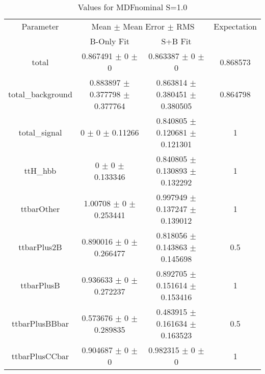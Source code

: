 \begin{table}
\centering
\caption{Values for MDFnominal S=1.0}
\begin{tabular}{cccc}
\toprule
Parameter & \multicolumn{2}{c}{Mean $\pm$ Mean Error $\pm$ RMS} & Expectation\\
 & B-Only Fit & S+B Fit & \\
\midrule
total & \num{0.867491} $\pm$ \num{0} $\pm$ \num{0} & \num{0.863387} $\pm$ \num{0} $\pm$ \num{0} & \num{0.868573}\\
total\_background & \num{0.883897} $\pm$ \num{0.377798} $\pm$ \num{0.377764} & \num{0.863814} $\pm$ \num{0.380451} $\pm$ \num{0.380505} & \num{0.864798}\\
total\_signal & \num{0} $\pm$ \num{0} $\pm$ \num{0.11266} & \num{0.840805} $\pm$ \num{0.120681} $\pm$ \num{0.121301} & \num{1}\\
ttH\_hbb & \num{0} $\pm$ \num{0} $\pm$ \num{0.133346} & \num{0.840805} $\pm$ \num{0.130893} $\pm$ \num{0.132292} & \num{1}\\
ttbarOther & \num{1.00708} $\pm$ \num{0} $\pm$ \num{0.253441} & \num{0.997949} $\pm$ \num{0.137247} $\pm$ \num{0.139012} & \num{1}\\
ttbarPlus2B & \num{0.890016} $\pm$ \num{0} $\pm$ \num{0.266477} & \num{0.818056} $\pm$ \num{0.143863} $\pm$ \num{0.145698} & \num{0.5}\\
ttbarPlusB & \num{0.936633} $\pm$ \num{0} $\pm$ \num{0.272237} & \num{0.892705} $\pm$ \num{0.151614} $\pm$ \num{0.153416} & \num{1}\\
ttbarPlusBBbar & \num{0.573676} $\pm$ \num{0} $\pm$ \num{0.289835} & \num{0.483915} $\pm$ \num{0.161634} $\pm$ \num{0.163523} & \num{0.5}\\
ttbarPlusCCbar & \num{0.904687} $\pm$ \num{0} $\pm$ \num{0} & \num{0.982315} $\pm$ \num{0} $\pm$ \num{0} & \num{1}\\
\bottomrule
\end{tabular}
\end{table}